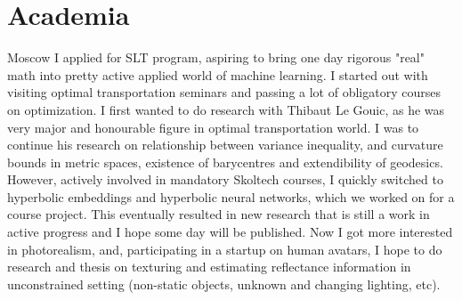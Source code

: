 \documentclass[10pt,a4paper]{moderncv}
\begin{document}
\section{Academia}
%
{Moscow}{}{
    I applied for SLT program, aspiring to bring one day rigorous "real" math
    into pretty active applied world of machine learning.
    I started out with visiting optimal transportation seminars
    and passing a lot of obligatory courses on optimization.
    I first wanted to do research with Thibaut Le Gouic, as he was
    very major and honourable figure in optimal transportation world.
    I was to continue his research on relationship
    between variance inequality, and curvature bounds in metric spaces,
    existence of barycentres and extendibility of geodesics.
    However, actively involved in mandatory Skoltech courses,
    I quickly switched to hyperbolic embeddings
    and hyperbolic neural networks, which we worked on for a course project.
    This eventually resulted in new research that is still a work in active progress
    and I hope some day will be published.
    Now I got more interested in photorealism, and, participating in a startup
    on human avatars, I hope to do research and thesis on texturing
    and estimating reflectance information in unconstrained setting
    (non-static objects, unknown and changing lighting, etc).}
\end{document}
